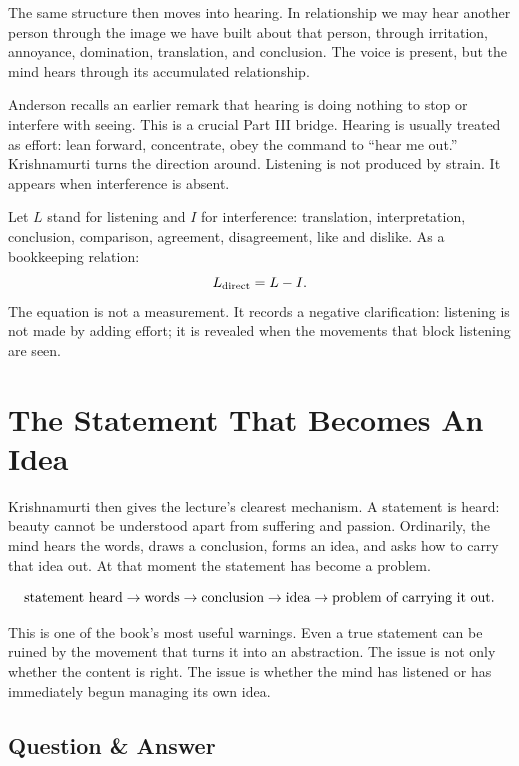 \documentclass[11pt,oneside]{book}
\begin{document}
The same structure then moves into hearing. In relationship we may hear another person through the image we have built about that person, through irritation, annoyance, domination, translation, and conclusion. The voice is present, but the mind hears through its accumulated relationship.

Anderson recalls an earlier remark that hearing is doing nothing to stop or interfere with seeing. This is a crucial Part III bridge. Hearing is usually treated as effort: lean forward, concentrate, obey the command to ``hear me out.'' Krishnamurti turns the direction around. Listening is not produced by strain. It appears when interference is absent.

Let \(L\) stand for listening and \(I\) for interference: translation, interpretation, conclusion, comparison, agreement, disagreement, like and dislike. As a bookkeeping relation:
\begin{equation}
L_{\rm direct}=L-I.
\end{equation}
The equation is not a measurement. It records a negative clarification: listening is not made by adding effort; it is revealed when the movements that block listening are seen.

\section{The Statement That Becomes An Idea}

Krishnamurti then gives the lecture's clearest mechanism. A statement is heard: beauty cannot be understood apart from suffering and passion. Ordinarily, the mind hears the words, draws a conclusion, forms an idea, and asks how to carry that idea out. At that moment the statement has become a problem.

\begin{equation}
\hbox{statement heard}
\to
\hbox{words}
\to
\hbox{conclusion}
\to
\hbox{idea}
\to
\hbox{problem of carrying it out}.
\end{equation}

This is one of the book's most useful warnings. Even a true statement can be ruined by the movement that turns it into an abstraction. The issue is not only whether the content is right. The issue is whether the mind has listened or has immediately begun managing its own idea.

\subsection{Question \& Answer}
\end{document}
